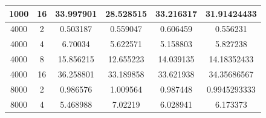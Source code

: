\documentclass{article}
\begin{document}
\begin{table}[H]
{\begin{tabular}{|c|c|ccc|c|}
    1000                                                                                   & 16                                                                                       & \multicolumn{1}{c|}{33.997901}      & \multicolumn{1}{c|}{28.528515}      & 33.216317      & 31.91424433                                                                                       \\ \hline
    4000                                                                                   & 2                                                                                        & \multicolumn{1}{c|}{0.503187}       & \multicolumn{1}{c|}{0.559047}       & 0.606459       & 0.556231                                                                                          \\ \hline
    4000                                                                                   & 4                                                                                        & \multicolumn{1}{c|}{6.70034}        & \multicolumn{1}{c|}{5.622571}       & 5.158803       & 5.827238                                                                                          \\ \hline
    4000                                                                                   & 8                                                                                        & \multicolumn{1}{c|}{15.856215}      & \multicolumn{1}{c|}{12.655223}      & 14.039135      & 14.18352433                                                                                       \\ \hline
    4000                                                                                   & 16                                                                                       & \multicolumn{1}{c|}{36.258801}      & \multicolumn{1}{c|}{33.189858}      & 33.621938      & 34.35686567                                                                                       \\ \hline
    8000                                                                                   & 2                                                                                        & \multicolumn{1}{c|}{0.986576}       & \multicolumn{1}{c|}{1.009564}       & 0.987448       & 0.9945293333                                                                                      \\ \hline
    8000                                                                                   & 4                                                                                        & \multicolumn{1}{c|}{5.468988}       & \multicolumn{1}{c|}{7.02219}        & 6.028941       & 6.173373                                                                                          \\ \hline

\end{tabular}}
\end{table}
\end{document}

